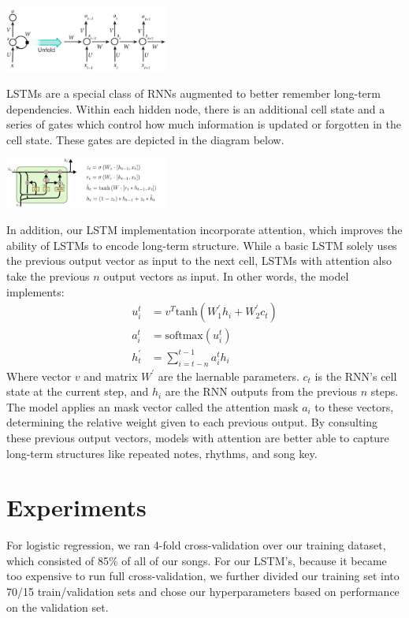 \documentclass[twoside,twocolumn]{article}
\begin{document}
\includegraphics[width = 0.4\textwidth]{rnn-diagram}

LSTMs are a special class of RNNs augmented to better remember long-term dependencies. Within each hidden node, there is an additional cell state and a series of gates which control how much information is updated or forgotten in the cell state. These gates are depicted in the diagram below.

\includegraphics[width = 0.4\textwidth]{colah-lstm-diagram}

In addition, our LSTM implementation incorporate attention, which improves the ability of LSTMs to encode long-term structure. While a basic LSTM solely uses the previous output vector as input to the next cell, LSTMs with attention also take the previous $n$ output vectors as input. In other words, the model implements:
\begin{align}
u_i^t &= v^T \text{tanh}(W_1^\prime h_i + W_2^\prime c_t) \\
a_i^t &= \text{softmax}(u_i^t) \\
h_t^\prime &= \sum_{i=t-n}^{t-1} a_i^t h_i
\end{align}
Where vector $v$ and matrix $W^\prime$ are the laernable parameters. $c_t$ is the RNN's cell state at the current step, and $h_i$ are the RNN outputs from the previous $n$ steps. The model applies an mask vector called the attention mask  $a_i$ to these vectors, determining the relative weight given to each previous output. By consulting these previous output vectors, models with attention are better able to capture long-term structures like repeated notes, rhythms, and song key. \\


\section{Experiments}

For logistic regression, we ran 4-fold cross-validation over our training dataset, which consisted of 85\% of all of our songs. For our LSTM's, because it became too expensive to run full cross-validation, we further divided our training set into 70/15 train/validation sets and chose our hyperparameters based on performance on the  validation set.
\end{document}
